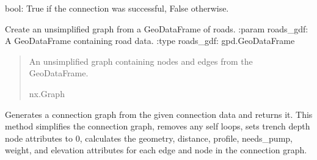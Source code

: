 \documentclass[letterpaper,10pt,english]{sphinxmanual}
\begin{document}
\begin{fulllineitems}
\begin{fulllineitems}
\begin{description}
\sphinxAtStartPar
bool: True if the connection was successful, False otherwise.

\end{description}

\end{fulllineitems}


\begin{fulllineitems}
\label{\detokenize{pysewer:pysewer.preprocessing.ModelDomain.create_unsimplified_graph}}
\pysigstartsignatures
{}
\pysigstopsignatures
\sphinxAtStartPar
Create an unsimplified graph from a GeoDataFrame of roads.
:param roads\_gdf: A GeoDataFrame containing road data.
:type roads\_gdf: gpd.GeoDataFrame
\begin{quote}\begin{description}
\sphinxAtStartPar
An unsimplified graph containing nodes and edges from the GeoDataFrame.

\sphinxAtStartPar
nx.Graph

\end{description}\end{quote}

\end{fulllineitems}


\begin{fulllineitems}
\label{\detokenize{pysewer:pysewer.preprocessing.ModelDomain.generate_connection_graph}}
\pysigstartsignatures
{}
\pysigstopsignatures
\sphinxAtStartPar
Generates a connection graph from the given connection data and returns it.
This method simplifies the connection graph, removes any self loops, sets trench depth node attributes to 0,
calculates the geometry, distance, profile, needs\_pump, weight, and elevation attributes for each edge and node
in the connection graph.



\end{fulllineitems}
\end{fulllineitems}
\end{document}
